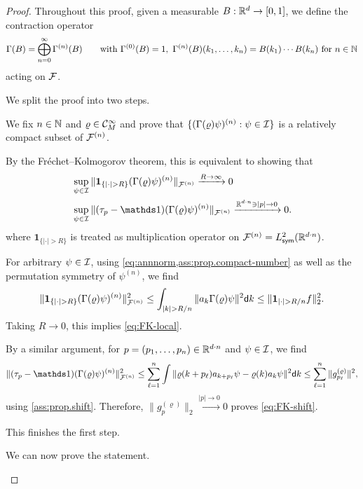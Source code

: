 \documentclass[a4paper,12pt,oneside]{article}
\newcommand{\chr}[1]{\mathbf{1}_{#1}}
\begin{document}
\begin{proof}	
	Throughout this proof, given a measurable $B:{\mathbb R}^d\to[0,1]$, we define the contraction operator
	\begin{equation}
		\Gamma(B) = \bigoplus_{n=0}^\infty \Gamma^{(n)}(B) \qquad\mbox{with}\ \Gamma^{(0)}(B)=1,\ \Gamma^{(n)}(B)(k_1,\ldots,k_n)=B(k_1)\cdots B(k_n)\ \mbox{for}\ n\in\IN
	\end{equation}
	acting on ${\mathcal F}$.
	
	We split the proof into two steps.
	\begin{step}\label{step:compact.1}
		We fix $n\in{\mathbb N}$ and $\varrho \in {\mathcal C}^\infty_M$ and
		prove that $\{(\Gamma(\varrho)\psi)^{(n)}:\psi\in {\mathcal I}\}$ is a relatively compact subset of ${\mathcal F}^{(n)}$. %
		
		By the Fr\'echet--Kolmogorov theorem, this is equivalent to showing that
		\begin{align}
			&\sup_{\psi\in\cI}\|\chr{\{|\cdot|>R\}}(\Gamma(\varrho)\psi)^{(n)}\|_{\FS^{(n)}} \xrightarrow{R\to \infty}0\label{eq:FK-local}\\
			&\sup_{\psi\in\cI}\|(\tau_p-\Id)(\Gamma(\varrho)\psi)^{(n)}\|_{\FS^{(n)}}\xrightarrow{\IR^{d\cdot n}\ni|p|\to 0} 0.\label{eq:FK-shift}
		\end{align}
		where $\chr{\{|\cdot|>R\}}$ is treated as multiplication operator on ${\mathcal F}^{(n)}=L^2_{{\mathsf s}{\mathsf y}{\mathsf m}}({\mathbb R}^{d\cdot n})$.
		
		For arbitrary $\psi\in{\mathcal I}$, using \cref{eq:annnorm,ass:prop.compact-number} as well as the permutation symmetry of $\psi^{(n)}$, we find
		\[ \|\chr{\{|\cdot|>R\}}(\Gamma(\varrho)\psi)^{(n)}\|_{\FS^{(n)}}^2 \le \int_{|k|>R/n} \|a_k\Gamma(\varrho)\psi\|^2\d k  \le \|\chr{|\cdot|>R/n}f\|_2^2.  \]
		Taking $R\to 0$, this implies \cref{eq:FK-local}.
		
		By a similar argument, for $p=(p_1,\ldots,p_n)\in{\mathbb R}^{d\cdot n}$ and $\psi\in{\mathcal I}$, we find
		\[ \|(\tau_p-\Id)(\Gamma(\varrho)\psi)^{(n)}\|_{\FS^{(n)}}^2 \le \sum_{\ell=1}^{n} \int \|\varrho(k+p_\ell)a_{k+p_\ell}\psi - \varrho(k)a_k\psi\|^2 \d k \le \sum_{\ell=1}^{n} \|g^{(\varrho)}_{p_\ell}\|^2,    \]
		using \cref{ass:prop.shift}.
		Therefore, $\|g^{(\varrho)}_p\|_2\xrightarrow{|p|\to 0}0$ proves \cref{eq:FK-shift}.
		
		This finishes the first step.
	\end{step}
	\begin{step}
		We can now prove the statement.
		

\end{step}
\end{proof}
\end{document}
